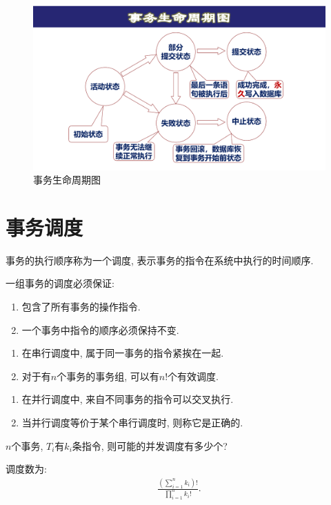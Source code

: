 \begin{figure}[H]
    \centering
    \includegraphics[width=.6\textwidth]{./figure/事务生命周期.pdf}
    \caption{事务生命周期图}
\end{figure}

\section{事务调度}

\begin{definition}[调度]
  事务的执行顺序称为一个调度, 表示事务的指令在系统中执行的时间顺序.

  一组事务的调度必须保证:
  \begin{enumerate}
      \item 包含了所有事务的操作指令.
      \item 一个事务中指令的顺序必须保持不变.
  \end{enumerate}
\end{definition}

\begin{definition}[串行调度]
  \begin{enumerate}
      \item 在串行调度中, 属于同一事务的指令紧挨在一起.
      \item 对于有$n$个事务的事务组, 可以有$n!$个有效调度.
  \end{enumerate}
\end{definition}

\begin{definition}[并行调度]
  \begin{enumerate}
      \item 在并行调度中, 来自不同事务的指令可以交叉执行.
      \item 当并行调度等价于某个串行调度时, 则称它是正确的.
  \end{enumerate}
\end{definition}

\begin{example}
  $n$个事务, $T_i$有$k_i$条指令, 则可能的并发调度有多少个?

  调度数为:
  \begin{align*}
      \frac{\left(\sum_{i=1}^{n}k_i\right)!}{\prod_{i=1}^n k_i!}.
  \end{align*}
\end{example}

